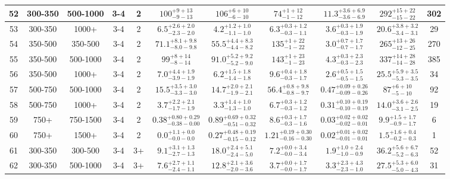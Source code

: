 \documentclass[11pt, oneside]{article}
\begin{document}
\begin{table}
{\begin{tabular}{ |c|c|c|c|c||c|c|c|c||c|c| }
52 & 300-350 & 500-1000 & 3-4 & 2 & $100^{+ 9+13}_{- 9-13}$ & $106^{+ 6+10}_{- 6-10}$ & $74^{+ 1+12}_{- 1-12}$ & $11.3^{+3.6+6.9}_{-3.6-6.9}$ & $292^{+15+22}_{-15-22}$ & 302 \\ \hline
53 & 300-350 & 1000+ & 3-4 & 2 & $6.5^{+2.6+2.0}_{-2.3-2.0}$ & $4.2^{+1.2+1.0}_{-1.1-1.0}$ & $6.3^{+0.3+1.2}_{-0.3-1.1}$ & $3.6^{+0.3+1.9}_{-0.3-1.9}$ & $20.6^{+3.8+3.2}_{-3.4-3.1}$ & 29 \\ \hline
54 & 350-500 & 350-500 & 3-4 & 2 & $71.1^{+8.1+9.8}_{-8.0-9.8}$ & $55.5^{+4.4+8.3}_{-4.4-8.2}$ & $135^{+ 1+22}_{- 1-22}$ & $3.0^{+0.7+1.7}_{-0.7-1.7}$ & $265^{+13+26}_{-12-25}$ & 270 \\ \hline
55 & 350-500 & 500-1000 & 3-4 & 2 & $99^{+ 8+14}_{- 8-14}$ & $91.0^{+5.2+9.2}_{-5.2-9.0}$ & $143^{+ 1+23}_{- 1-23}$ & $4.3^{+0.3+2.3}_{-0.3-2.3}$ & $337^{+14+28}_{-14-28}$ & 385 \\ \hline
56 & 350-500 & 1000+ & 3-4 & 2 & $7.0^{+4.4+1.9}_{-3.9-1.9}$ & $6.2^{+1.5+1.8}_{-1.4-1.8}$ & $9.6^{+0.4+1.8}_{-0.3-1.7}$ & $2.6^{+0.5+1.5}_{-0.5-1.5}$ & $25.5^{+5.9+3.5}_{-5.3-3.5}$ & 34 \\ \hline
57 & 500-750 & 500-1000 & 3-4 & 2 & $15.5^{+3.5+3.0}_{-3.3-3.0}$ & $14.7^{+2.0+2.1}_{-1.9-2.1}$ & $56.4^{+0.8+9.8}_{-0.8-9.7}$ & $0.47^{+0.09+0.26}_{-0.09-0.26}$ & $87^{+ 6+10}_{- 5-10}$ & 92 \\ \hline
58 & 500-750 & 1000+ & 3-4 & 2 & $3.7^{+2.2+2.1}_{-1.7-1.9}$ & $3.3^{+1.4+1.0}_{-1.3-1.0}$ & $6.7^{+0.3+1.2}_{-0.3-1.2}$ & $0.31^{+0.10+0.19}_{-0.10-0.19}$ & $14.0^{+3.6+2.6}_{-3.1-2.5}$ & 19 \\ \hline
59 & 750+ & 750-1500 & 3-4 & 2 & $0.38^{+0.80+0.29}_{-0.38-0.00}$ & $0.89^{+0.69+0.32}_{-0.51-0.32}$ & $8.6^{+0.3+1.7}_{-0.3-1.6}$ & $0.03^{+0.02+0.02}_{-0.02-0.01}$ & $9.9^{+1.5+1.7}_{-0.9-1.7}$ & 6 \\ \hline
60 & 750+ & 1500+ & 3-4 & 2 & $0.0^{+1.1+0.0}_{-0.0-0.0}$ & $0.27^{+0.48+0.19}_{-0.15-0.12}$ & $1.21^{+0.19+0.30}_{-0.16-0.30}$ & $0.02^{+0.01+0.02}_{-0.01-0.01}$ & $1.5^{+1.6+0.4}_{-0.2-0.3}$ & 1 \\ \hline
61 & 300-350 & 300-500 & 3-4 & 3+ & $9.1^{+3.1+1.3}_{-2.7-1.3}$ & $18.0^{+2.4+5.1}_{-2.4-5.0}$ & $7.2^{+0.0+3.4}_{-0.0-3.4}$ & $1.9^{+1.0+2.4}_{-1.0-0.9}$ & $36.2^{+5.6+6.7}_{-5.2-6.3}$ & 52 \\ \hline
62 & 300-350 & 500-1000 & 3-4 & 3+ & $7.6^{+2.7+1.1}_{-2.4-1.1}$ & $12.8^{+2.1+3.6}_{-2.0-3.6}$ & $3.7^{+0.0+1.7}_{-0.0-1.7}$ & $3.3^{+2.3+4.3}_{-2.3-1.0}$ & $27.5^{+5.3+6.0}_{-5.0-4.3}$ & 31 \\ \hline

\end{tabular}}
\end{table}
\end{document}

